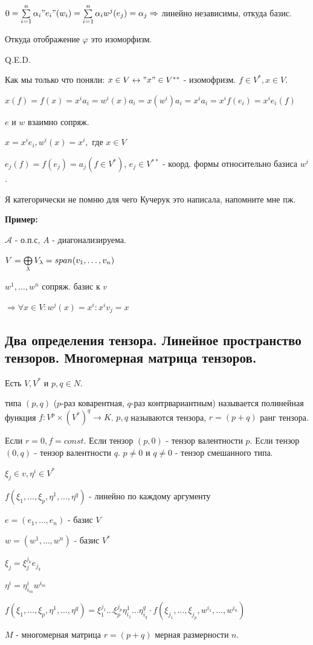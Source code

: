 $0= \sum\limits_{i=1}^n \alpha_i "e_i"(w_i)=\sum\limits_{i=1}^n\alpha_i w^j(e_j) = \alpha_j \Rightarrow$ линейно независимы, откуда базис.

Откуда отображение $\varphi$ это изоморфизм.

\hfill Q.E.D.

Как мы только что поняли: $x \in V \leftrightarrow "x" \in V^{**}$ - изомофризм. $f\in V^{*}, x \in V$.

$x(f)= f(x) = x^i a_i = w^i(x) a_i = x(w^i)a_i =x^ia_i=x^i f(e_i)=x^ie_i(f)$

$e \text{ и }w$ взаимно сопряж.

$x=x^ie_i, w^i(x)=x^i,$ где $x \in V$

$e_j(f)=f(e_j)=a_j(f \in V^*)$, $e_j \in V^{**}$ - коорд. формы относительно базиса $w^i$.

Я категорически не помню для чего Кучерук это написала, напомните мне пж.





\textbf{Пример:}

$\mathcal{A}$ - о.п.с, $A$ - диагонализируема.

$V = \bigoplus\limits_{\lambda}V_{\lambda} = span (v_1,\ldots,v_n)$

$w^1,\ldots,w^n$ сопряж. базис к $v$  %

$\Rightarrow \forall x \in V: w^j(x) =x^i: x^iv_j = x$ 

\newpage
\subsection{Два определения тензора. Линейное пространство тензоров. Многомерная матрица тензоров.}

 Есть $V,V^*$ и $p,q \in N$.

 типа $(p,q)$ ($p$-раз коварентная, $q$-раз контрвариантным) называется полинейная функция $f: V^p\times (V^*)^q \rightarrow K$. $p,q$ называются  тензора, $r = (p+q)$ ранг тензора.

Если $r = 0, f = const$. Если тензор $(p,0) $ -  тензор валентности $p$. Если тензор $(0,q)$ -  тензор валентности $q$. $p\neq 0 $ и $q\neq 0$ - тензор смешанного типа.

$\xi_j \in v, \eta^i \in V^*$

$f(\xi_1,\ldots,\xi_p,\eta^1,\ldots, \eta^q)$ - линейно по каждому аргументу

$e = (e_1,\ldots, e_n)$ - базис $V$

$w = (w^1,\ldots, w^n)$ - базис $V^*$

$\xi_j = \xi_j^{j_k}e_{j_k}$

$\eta^i = \eta_{i_m}^iw^{i_m}$

$f(\xi_1,\ldots,\xi_p,\eta^1,\ldots, \eta^q) = \xi_1^{j_1}\ldots\xi_p^{j_p}\eta_{i_1}^1 \ldots \eta^q_{i_q} \cdot f(\xi_{j_1},\ldots, \xi_{j_p},w^{i_1},\ldots, w^{i_n})$


 $M$ - многомерная матрица $r = (p+q)$ мерная  размерности $n$. %
